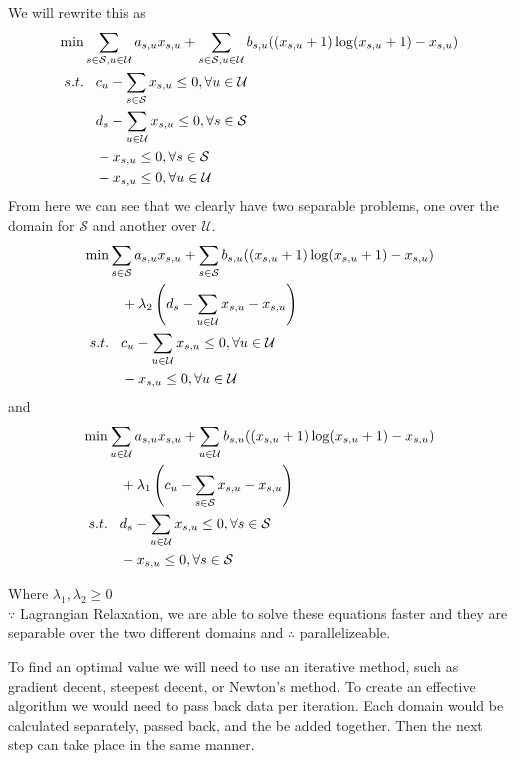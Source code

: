 \documentclass[12pt,letter]{article}
\begin{document}
We will rewrite this as
\begin{align*}
\min\hspace{3mm}&\hspace{-3mm}\sum\limits_{s\in\mathcal{S},u\in\mathcal{U}}a_{s,u}x_{s,u} + 
	\sum\limits_{s\in\mathcal{S},u\in\mathcal{U}}b_{s,u}((x_{s,u}+1)\log(x_{s,u}+1)-x_{s,u})\\
s.t.\hspace{3mm} &c_u - \sum\limits_{s\in\mathcal{S}}x_{s,u}\leq 0, \forall u\in\mathcal{U}\\ 
     &d_s - \sum\limits_{u\in\mathcal{U}}x_{s,u}\leq 0, \forall s\in\mathcal{S}\\
     &-x_{s,u}\leq 0, \forall s\in\mathcal{S}\\
     &-x_{s,u}\leq 0, \forall u\in\mathcal{U}
\end{align*}
From here we can see that we clearly have two separable problems, one over the
domain for $\mathcal{S}$ and another over $\mathcal{U}$.
\begin{align*}
\min\hspace{3mm}&\hspace{-3mm}\sum\limits_{s\in\mathcal{S}}a_{s,u}x_{s,u} + 
	\sum\limits_{s\in\mathcal{S}}b_{s,u}((x_{s,u}+1)\log(x_{s,u}+1)-x_{s,u}) \\
	&+ \lambda_2 \left(d_s - \sum\limits_{u\in\mathcal{U}}x_{s,u} -x_{s,u}\right)\\
 s.t.\hspace{3mm}    &c_u - \sum\limits_{u\in\mathcal{U}}x_{s,u}\leq 0, \forall u\in\mathcal{U}\\
     &-x_{s,u}\leq 0, \forall u\in\mathcal{U}\\
\end{align*}
and
\begin{align*}
\min\hspace{3mm}&\hspace{-3mm}\sum\limits_{u\in\mathcal{U}}a_{s,u}x_{s,u} + 
	\sum\limits_{u\in\mathcal{U}}b_{s,u}((x_{s,u}+1)\log(x_{s,u}+1)-x_{s,u}) \\
	&+ \lambda_1 \left(c_u - \sum\limits_{s\in\mathcal{S}}x_{s,u} -x_{s,u}\right)\\
 s.t.\hspace{3mm}    &d_s - \sum\limits_{u\in\mathcal{U}}x_{s,u}\leq 0, \forall s\in\mathcal{S}\\
     &-x_{s,u}\leq 0, \forall s\in\mathcal{S}\\
\end{align*}

Where $\lambda_1, \lambda_2 \geq 0$\\
$\because$ Lagrangian Relaxation, we are able to solve these equations faster 
and they are separable over the two different domains and $\therefore$ 
parallelizeable. 

To find an optimal value we will need to use an iterative method, such as
gradient decent, steepest decent, or Newton's method. 
To create an effective algorithm we would need to pass back data per iteration.
Each domain would be calculated separately, passed back, and the be added together.
Then the next step can take place in the same manner.
\end{document}
